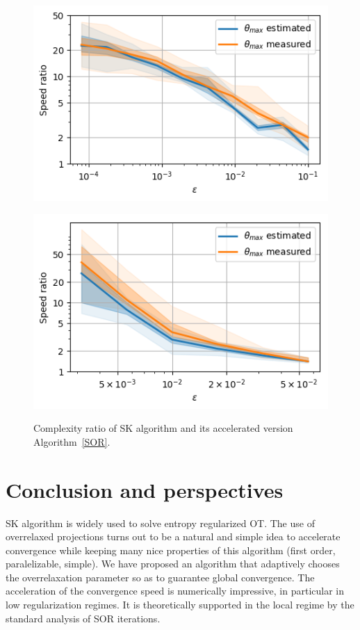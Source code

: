 \documentclass{article} %
\theoremstyle{plain}
\theoremstyle{definition}
\theoremstyle{remark}
\begin{document}
\begin{figure}
\begin{minipage}[b]{.5\linewidth}
   \centering
   \includegraphics[scale=0.5]{images/speedratio_image}
                    \label{fig:compare_a}
\end{minipage}%
			\begin{minipage}[b]{.5\linewidth}
                    \centering
			\includegraphics[scale=0.5]{images/speedratio_ML}
                    \label{fig:compare_b}
\end{minipage}
			\caption{\label{fig:comparison}Complexity ratio of SK algorithm and its accelerated version Algorithm~\ref{SOR}.}%
\end{figure}


\section{Conclusion and perspectives}
SK algorithm is widely used to solve entropy regularized OT. The use of overrelaxed projections turns out to be a natural and simple idea to accelerate convergence while keeping many nice properties of this algorithm (first order, paralelizable, simple). We have proposed an algorithm that adaptively chooses the overrelaxation parameter so as to guarantee global convergence. The acceleration of the convergence speed is numerically impressive, in particular in low regularization regimes. It is theoretically supported in the local regime by the standard analysis of SOR iterations.
\end{document}
